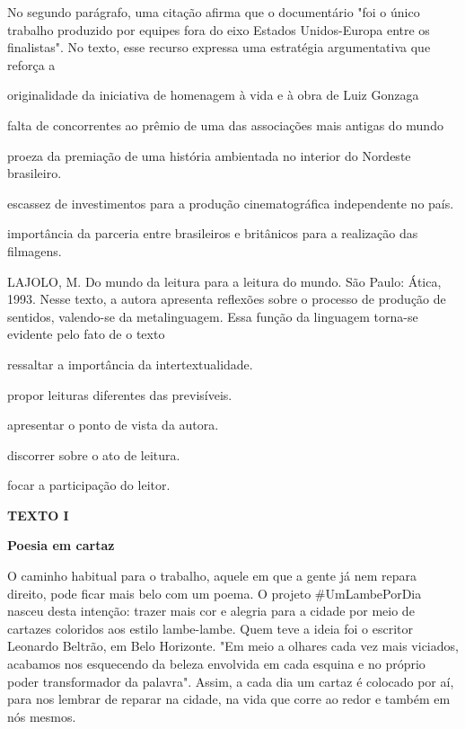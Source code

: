 No segundo parágrafo, uma citação afirma que o documentário "foi o único trabalho produzido por equipes fora do eixo Estados Unidos-Europa entre os finalistas". No texto, esse recurso expressa uma estratégia argumentativa que reforça a
\begin{alternativas}
  \item originalidade da iniciativa de homenagem à vida e à obra de Luiz Gonzaga
  \item falta de concorrentes ao prêmio de uma das associações mais antigas do mundo
  \item proeza da premiação de uma história ambientada no interior do Nordeste brasileiro.
  \item escassez de investimentos para a produção cinematográfica independente no país.
  \item importância da parceria entre brasileiros e britânicos para a realização das filmagens.
\end{alternativas}


\questao
{} {
  LAJOLO, M. Do mundo da leitura para a leitura do mundo. São Paulo: Ática, 1993.
}
Nesse texto, a autora apresenta reflexões sobre o processo de produção de sentidos, valendo-se da metalinguagem. Essa função da linguagem torna-se evidente pelo fato de o texto
\begin{alternativas}
  \item ressaltar a importância da intertextualidade.
  \item propor leituras diferentes das previsíveis.
  \item apresentar o ponto de vista da autora.
  \item discorrer sobre o ato de leitura.
  \item focar a participação do leitor.
\end{alternativas}


\questao
\textbf{TEXTO I}
\begin{center}
  \textbf{Poesia em cartaz}
\end{center}
O caminho habitual para o trabalho, aquele em que a gente já nem repara direito, pode ficar mais belo com um poema. O projeto \#UmLambePorDia nasceu desta intenção: trazer mais cor e alegria para a cidade por meio de cartazes coloridos aos estilo lambe-lambe. Quem teve a ideia foi o escritor Leonardo Beltrão, em Belo Horizonte. "Em meio a olhares cada vez mais viciados, acabamos nos esquecendo da beleza envolvida em cada esquina e no próprio poder transformador da palavra". Assim, a cada dia um cartaz é colocado por aí, para nos lembrar de reparar na cidade, na vida que corre ao redor e também em nós mesmos.

